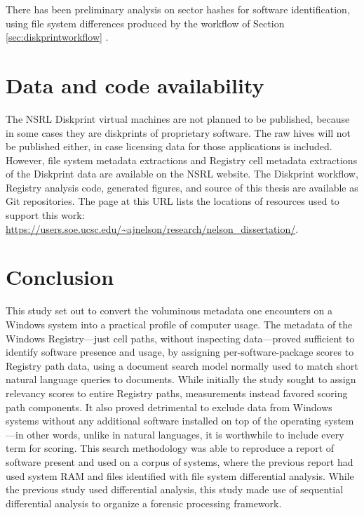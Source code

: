 \documentclass[11pt]{ucthesis}
\theoremstyle{plain}
\theoremstyle{definition}
\begin{document}
There has been preliminary analysis on sector hashes for software identification, using file system differences produced by the workflow of Section \ref{sec:diskprintworkflow} \cite{jones:adfsl16}.


\section{Data and code availability}

The NSRL Diskprint virtual machines are not planned to be published, because in some cases they are diskprints of proprietary software.  The raw hives will not be published either, in case licensing data for those applications is included.  However, file system metadata extractions and Registry cell metadata extractions of the Diskprint data are available on the NSRL website.  The Diskprint workflow, Registry analysis code, generated figures, and source of this thesis are available as Git repositories.  The page at this URL lists the locations of resources used to support this work: \url{https://users.soe.ucsc.edu/~ajnelson/research/nelson_dissertation/}.


\section{Conclusion}

This study set out to convert the voluminous metadata one encounters on a Windows system into a practical profile of computer usage.  The metadata of the Windows Registry---just cell paths, without inspecting data---proved sufficient to identify software presence and usage, by assigning per-software-package scores to Registry path data, using a document search model normally used to match short natural language queries to documents.  While initially the study sought to assign relevancy scores to entire Registry paths, measurements instead favored scoring path components.  It also proved detrimental to exclude data from Windows systems without any additional software installed on top of the operating system---in other words, unlike in natural languages, it is worthwhile to include every term for scoring.  This search methodology was able to reproduce a report of software present and used on a corpus of systems, where the previous report had used system RAM and files identified with file system differential analysis.  While the previous study used differential analysis, this study made use of sequential differential analysis to organize a forensic processing framework.
\end{document}
